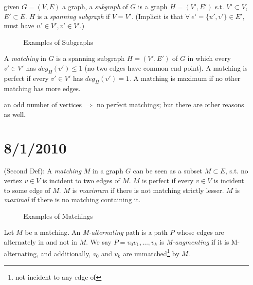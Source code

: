 \documentclass{article}
\begin{document}
\begin{defn}
given $G=(V,E)$ a graph, a \emph{subgraph} of $G$ is a graph $H=(V',E')$ s.t. $V'\subset V$, $E' \subset E$.  $H$ is a \emph{spanning subgraph} if $V=V'$. (Implicit is that $\forall~ e'=\{u',v'\}\in E'$, must have $u' \in V', v' \in V'$.)
\end{defn}

\begin{figure}[H]
\centering
{}\qquad \quad
{}\qquad \quad
{}
\caption{Examples of Subgraphs}
\end{figure}

\begin{defn}
A \emph{matching} in $G$ is a spanning subgraph $H=(V',E')$ of $G$ in which every $v' \in V'$ has $deg_H(v')\leq 1$ (no two edges have common end point).  A matching is perfect if every $v'\in V'$ has $deg_H(v')=1$.  A matching is maximum if no other matching has more edges.
\end{defn}

\begin{rem}
an odd number of vertices $\Rightarrow$ no perfect matchings; but there are other reasons as well.
\end{rem}


\section*{8/1/2010}

\begin{defn}
(Second Def): A \emph{matching} $M$ in a graph $G$ can be seen as a subset $M\subset E$, s.t. no vertex $v \in V$ is incident to two edges of $M$.  $M$ is perfect if every $v \in V$ is incident to some edge of $M$.  $M$ is \emph{maximum} if there is not matching strictly lesser.  $M$ is \emph{maximal} if there is no matching containing it.
\end{defn}

\begin{figure}[H]
\caption{Examples of Matchings}
\centering
{}\qquad
{}
\end{figure}

\begin{defn}
Let $M$ be a matching.  An \emph{M-alternating} path is a path $P$ whose edges are alternately in and not in $M$.  We say $P=v_0 v_1 , \ldots, v_k$ is \emph{M-augmenting} if it is M-alternating, and additionally, $v_0$ and $v_k$ are unmatched\footnote{not incident to any edge of} by $M$.
\end{defn}
\end{document}
